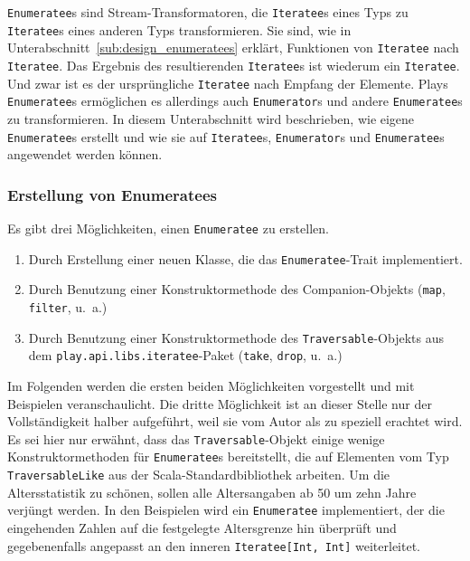 \lstinline|Enumeratee|s sind Stream-Transformatoren, die \lstinline|Iteratee|s eines Typs zu \lstinline|Iteratee|s eines anderen Typs transformieren.
Sie sind, wie in Unterabschnitt~\ref{sub:design_enumeratees} erklärt, Funktionen von \lstinline|Iteratee| nach \lstinline|Iteratee|.
Das Ergebnis des resultierenden \lstinline|Iteratee|s ist wiederum ein \lstinline|Iteratee|.
Und zwar ist es der ursprüngliche \lstinline|Iteratee| nach Empfang der Elemente.
Plays \lstinline|Enumeratee|s ermöglichen es allerdings auch \lstinline|Enumerator|s und andere \lstinline|Enumeratee|s zu transformieren.
In diesem Unterabschnitt wird beschrieben, wie eigene \lstinline|Enumeratee|s erstellt und wie sie auf \lstinline|Iteratee|s, \lstinline|Enumerator|s und \lstinline|Enumeratee|s angewendet werden können.

\subsubsection{Erstellung von Enumeratees} %
\label{ssub:erstellung_von_enumeratees}

Es gibt drei Möglichkeiten, einen \lstinline|Enumeratee| zu erstellen.

\begin{enumerate}
  \item Durch Erstellung einer neuen Klasse, die das \lstinline|Enumeratee|-Trait implementiert.
  \item Durch Benutzung einer Konstruktormethode des Companion-Objekts (\lstinline|map|, \lstinline|filter|, u.~a.)
  \item Durch Benutzung einer Konstruktormethode des \lstinline|Traversable|-Objekts aus dem \lstinline|play.api.libs.iteratee|-Paket (\lstinline|take|, \lstinline|drop|, u.~a.)
\end{enumerate}

Im Folgenden werden die ersten beiden Möglichkeiten vorgestellt und mit Beispielen veranschaulicht.
Die dritte Möglichkeit ist an dieser Stelle nur der Vollständigkeit halber aufgeführt, weil sie vom Autor als zu speziell erachtet wird.
Es sei hier nur erwähnt, dass das \lstinline|Traversable|-Objekt einige wenige Konstruktormethoden für \lstinline|Enumeratee|s bereitstellt, die auf Elementen vom Typ \lstinline|TraversableLike| aus der Scala-Standardbibliothek arbeiten.
Um die Altersstatistik zu schönen, sollen alle Altersangaben ab 50 um zehn Jahre verjüngt werden.
In den Beispielen wird ein \lstinline|Enumeratee| implementiert, der die eingehenden Zahlen auf die festgelegte Altersgrenze hin überprüft und gegebenenfalls angepasst an den inneren \lstinline|Iteratee[Int, Int]| weiterleitet.

